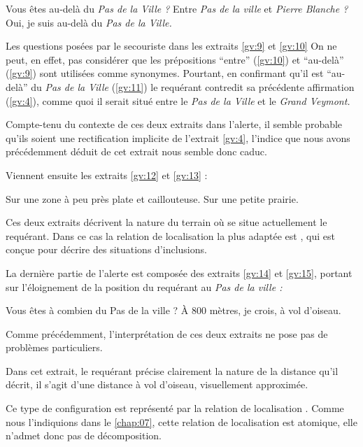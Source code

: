 \begin{dialogue}
  \Sec {} Vous êtes au-delà du \emph{Pas de la Ville ?}
   Entre \emph{Pas de la ville} et \emph{Pierre
    Blanche ?}
  \Req {} Oui, je suis au-delà du \emph{Pas de la
    Ville.}
\end{dialogue}
%
Les questions posées par le secouriste dans les extraits \ref{gv:9} et
\ref{gv:10}
%
On ne peut, en effet, pas considérer que les prépositions
\enquote{entre} (\ref{gv:10}) et \enquote{au-delà} (\ref{gv:9}) sont
utilisées comme synonymes.
%
Pourtant, en confirmant qu'il est \enquote{au-delà} du \emph{Pas de la
  Ville} (\ref{gv:11}) le requérant contredit sa précédente
affirmation (\ref{gv:4}), comme quoi il serait situé entre le
\emph{Pas de la Ville} et le \emph{Grand Veymont.}

Compte-tenu du contexte de ces deux extraits dans l'alerte, il semble
probable qu'ils soient une rectification implicite de l'extrait
\ref{gv:4}, l'indice que nous avons précédemment déduit de cet extrait
nous semble donc caduc.

Viennent ensuite les extraits \ref{gv:12} et \ref{gv:13} :
%
\begin{dialogue}
  \Req {} Sur une zone à peu près plate et
  caillouteuse.  Sur une petite prairie.
\end{dialogue}
%
Ces deux extraits décrivent la nature du terrain où se situe
actuellement le requérant. Dans ce cas la relation de localisation la
plus adaptée est , qui est conçue pour
décrire des situations d'inclusions.


La dernière partie de l'alerte est composée des extraits \ref{gv:14}
et \ref{gv:15}, portant sur l'éloignement de la position du requérant
au \emph{Pas de la ville :}
%
\begin{dialogue}
  \Sec {} Vous êtes à combien du Pas de la ville ?
  \Req {} À 800 mètres, je crois, à vol d'oiseau.
\end{dialogue}
%
Comme précédemment, l'interprétation de ces deux extraits ne pose pas
de problèmes particuliers.


Dans cet extrait, le requérant précise clairement la nature de la
distance qu'il décrit, il s'agit d'une distance à vol d'oiseau,
visuellement approximée.

Ce type de configuration est représenté par la relation de
localisation
. Comme nous
l'indiquions dans le \autoref{chap:07}, cette relation de localisation
est atomique, elle n'admet donc pas de décomposition.

